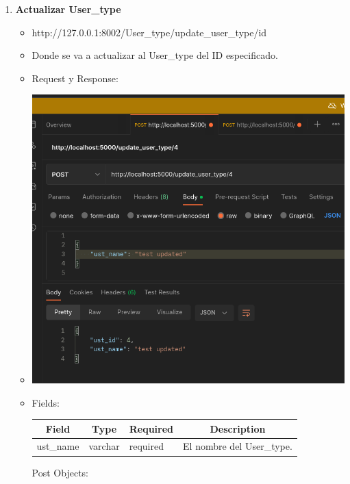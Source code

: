 \documentclass{article}
\begin{document}
\begin{enumerate}
\begin{itemize}
    \end{itemize}

    \item \textbf{Actualizar User\_type}
    \begin{itemize}
        \item http://127.0.0.1:8002/User\_type/update\_user\_type/id
        \item Donde se va a actualizar al User\_type del ID especificado.
        \item Request y Response:
        \item \includegraphics[scale=.5]{assets/user_type/update_user_type.png}
        \item Fields:
        \begin{table}[H] \centering \begin{tabular}{|l|l|l|l|} \hline
        \multicolumn{1}{|c|}{\textbf{Field}} &
        \multicolumn{1}{c|}{\textbf{Type}} &
        \multicolumn{1}{c|}{\textbf{Required}} &
        \multicolumn{1}{c|}{\textbf{Description}} \\ \hline ust\_name & varchar
        & required & El nombre del User\_type. \\ \hline \end{tabular}
        \end{table} Post Objects: \begin{table}[H] \centering \begin{tabular}{|l|l|l|}

\end{tabular}
\end{table}
\end{itemize}
\end{enumerate}
\end{document}
